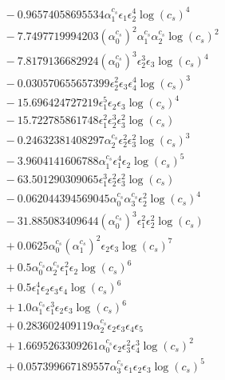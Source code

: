\documentclass[10pt]{article}
\begin{document}
\begin{align*}
&{}  - 0.96574058695534 \alpha_{1}^{c_s} \epsilon_{1} \epsilon_{2}^{4} \log{\left(c_{s} \right)}^{4} \\
&{}  - 7.7497719994203 \left(\alpha_{0}^{c_s}\right)^{2} \alpha_{1}^{c_s} \alpha_{2}^{c_s} \log{\left(c_{s} \right)}^{2} \\
&{}  - 7.8179136682924 \left(\alpha_{0}^{c_s}\right)^{3} \epsilon_{2}^{3} \epsilon_{3} \log{\left(c_{s} \right)}^{4} \\
&{}  - 0.030570655657399 \epsilon_{2}^{2} \epsilon_{3} \epsilon_{4}^{4} \log{\left(c_{s} \right)}^{3} \\
&{}  - 15.696424727219 \epsilon_{1}^{5} \epsilon_{2} \epsilon_{3} \log{\left(c_{s} \right)}^{4} \\
&{}  - 15.722785861748 \epsilon_{1}^{2} \epsilon_{2}^{3} \epsilon_{3}^{2} \log{\left(c_{s} \right)} \\
&{}  - 0.24632381408297 \alpha_{2}^{c_s} \epsilon_{2}^{2} \epsilon_{3}^{2} \log{\left(c_{s} \right)}^{3} \\
&{}  - 3.9604141606788 \alpha_{1}^{c_s} \epsilon_{1}^{4} \epsilon_{2} \log{\left(c_{s} \right)}^{5} \\
&{}  - 63.501290309065 \epsilon_{1}^{3} \epsilon_{2}^{2} \epsilon_{3}^{2} \log{\left(c_{s} \right)} \\
&{}  - 0.062044394569045 \alpha_{0}^{c_s} \alpha_{3}^{c_s} \epsilon_{2}^{2} \log{\left(c_{s} \right)}^{4} \\
&{}  - 31.885083409644 \left(\alpha_{0}^{c_s}\right)^{3} \epsilon_{1}^{2} \epsilon_{2}^{2} \log{\left(c_{s} \right)} \\
&{}  + 0.0625 \alpha_{0}^{c_s} \left(\alpha_{1}^{c_s}\right)^{2} \epsilon_{2} \epsilon_{3} \log{\left(c_{s} \right)}^{7} \\
&{}  + 0.5 \alpha_{0}^{c_s} \alpha_{2}^{c_s} \epsilon_{1}^{2} \epsilon_{2} \log{\left(c_{s} \right)}^{6} \\
&{}  + 0.5 \epsilon_{1}^{4} \epsilon_{2} \epsilon_{3} \epsilon_{4} \log{\left(c_{s} \right)}^{6} \\
&{}  + 1.0 \alpha_{1}^{c_s} \epsilon_{1}^{3} \epsilon_{2} \epsilon_{3} \log{\left(c_{s} \right)}^{6} \\
&{}  + 0.283602409119 \alpha_{2}^{c_s} \epsilon_{2} \epsilon_{3} \epsilon_{4} \epsilon_{5} \\
&{}  + 1.6695263309261 \alpha_{0}^{c_s} \epsilon_{2} \epsilon_{3}^{2} \epsilon_{4}^{3} \log{\left(c_{s} \right)}^{2} \\
&{}  + 0.057399667189557 \alpha_{3}^{c_s} \epsilon_{1} \epsilon_{2} \epsilon_{3} \log{\left(c_{s} \right)}^{5} \\

\end{align*}
\end{document}
